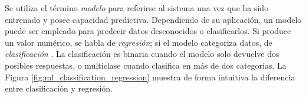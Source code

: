

Se utiliza el término \emph{modelo} para referirse al sistema una vez que ha sido entrenado y posee capacidad predictiva. Dependiendo de su aplicación, un modelo puede ser empleado para predecir datos desconocidos o clasificarlos. Si produce un valor numérico, se habla de \emph{regresión}; si el modelo categoriza datos, de \emph{clasificación} \citep{zhang2023dive}. La clasificación es binaria cuando el modelo solo devuelve dos posibles respuestas, o multiclase cuando clasifica en más de dos categorías. La Figura \ref{fig:ml_classification_regression} muestra de forma intuitiva la diferencia entre clasificación y regresión.

